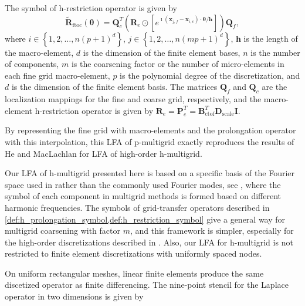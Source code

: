 \documentclass[review]{siamart190516}
\begin{document}
\begin{definition}\label{def:h_restriction_symbol}
The symbol of h-restriction operator is given by
\begin{equation}
\tilde{\mathbf{R}}_{\text{ftoc}} \left( \boldsymbol{\theta} \right) = \mathbf{Q}_c^T \left( \mathbf{R}_e \odot \left[ e^{\imath \left( \mathbf{x}_{j, f} - \mathbf{x}_{i, c} \right) \cdot \boldsymbol{\theta} / \mathbf{h}} \right] \right) \mathbf{Q}_f,
\end{equation}
where $i \in \left\lbrace 1, 2, \dots, n \left( p + 1 \right)^d \right\rbrace$, $j \in \left\lbrace 1, 2, \dots, n \left( m p + 1 \right)^d \right\rbrace$, $\mathbf{h}$ is the length of the macro-element, $d$ is the dimension of the finite element bases, $n$ is the number of components, $m$ is the coarsening factor or the number of micro-elements in each fine grid macro-element, $p$ is the polynomial degree of the discretization, and $d$ is the dimension of the finite element basis.
The matrices $\mathbf{Q}_f$ and $\mathbf{Q}_c$ are the localization mappings for the fine and coarse grid, respectively, and the macro-element h-restriction operator is given by $\mathbf{R}_e = \mathbf{P}_e^T = \mathbf{B}_{\text{ctof}}^T \mathbf{D}_{\text{scale}} \mathbf{I}$.
\end{definition}

By representing the fine grid with macro-elements and the prolongation operator with this interpolation, this LFA of p-multigrid exactly reproduces the results of He and MacLachlan \cite{he2020two} for LFA of high-order h-multigrid.

Our LFA of h-multigrid presented here is based on a specific basis of the Fourier space used in \cite{kumar2019local} rather than the commonly used Fourier modes, see \cite{MR1807961, wienands2004practical}, where the symbol of each component in multigrid methods is formed based on different harmonic frequencies.
The symbols of grid-transfer operators described in \cref{def:h_prolongation_symbol,def:h_restriction_symbol} give a general way for multigrid coarsening with factor $m$, and this framework is simpler, especially for the high-order discretizations described in \cite{he2020two}.
Also, our LFA for h-multigrid is not restricted to finite element discretizations with uniformly spaced nodes.

On uniform rectangular meshes, linear finite elements produce the same discetized operator as finite differencing.
The nine-point stencil for the Laplace operator in two dimensions is given by
\end{document}

